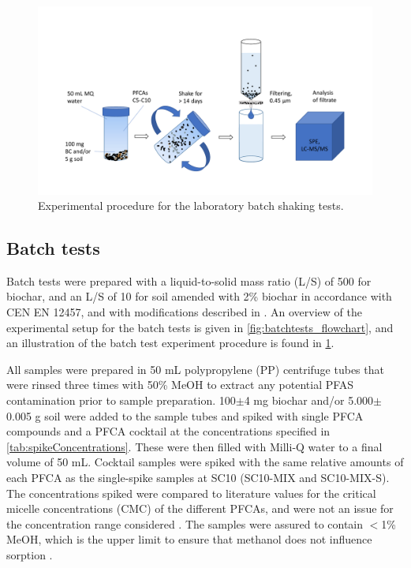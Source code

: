 \begin{figure}
    \centering
    \includegraphics[width=\textwidth]{Diagrams/Batch_test.pdf}
    \caption{Experimental procedure for the laboratory batch shaking tests.}
    \label{fig:batchtest_setup}
\end{figure}

\subsection{Batch tests\label{sec:S-BC}}
Batch tests were prepared with a liquid-to-solid mass ratio (L/S) of 500 for biochar, and an L/S of 10 for soil amended with 2\% biochar in accordance with CEN EN 12457, and with modifications described in \citep{Hale2017fire, kupryianchyk2016biochar}. An overview of the experimental setup for the batch tests is given in \cref{fig:batchtests_flowchart}, and an illustration of the batch test experiment procedure is found in \cref{fig:batchtest_setup}.

All samples were prepared in 50 mL polypropylene (PP) centrifuge tubes that were rinsed three times with 50\% MeOH to extract any potential PFAS contamination prior to sample preparation. 100$\pm$4 mg biochar and/or 5.000$\pm$0.005 g soil were added to the sample tubes and spiked with single PFCA compounds and a PFCA cocktail at the concentrations specified in \cref{tab:spikeConcentrations}. These were then filled with Milli-Q water to a final volume of 50 mL. Cocktail samples were spiked with the same relative amounts of each PFCA as the single-spike samples at SC10 (SC10-MIX and SC10-MIX-S). The concentrations spiked were compared to literature values for the critical micelle concentrations (CMC) of the different PFCAs, and were not an issue for the concentration range considered \citep{bhhatarai2011,ding2013physicochemical}. The samples were assured to contain $<$1\% MeOH, which is the upper limit to ensure that methanol does not influence sorption \citep{arvaniti2014}.

